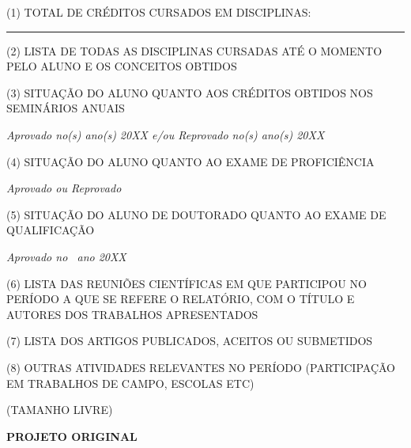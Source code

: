 \documentclass[12pt,a4paper]{article}
\begin{document}
\vspace{1cm}

\noindent (1) TOTAL DE CRÉDITOS CURSADOS EM DISCIPLINAS: \rule{2cm}{0.4pt}

\bigskip

\noindent (2) LISTA DE TODAS AS DISCIPLINAS CURSADAS ATÉ O MOMENTO PELO ALUNO
E OS CONCEITOS OBTIDOS

\bigskip


\bigskip

\noindent (3) SITUAÇÃO DO ALUNO QUANTO AOS CRÉDITOS OBTIDOS NOS SEMINÁRIOS
ANUAIS

\bigskip

{\centering\itshape
Aprovado no(s) ano(s) 20XX e/ou Reprovado no(s) ano(s) 20XX
\par}

\bigskip

\noindent (4) SITUAÇÃO DO ALUNO QUANTO AO EXAME DE PROFICIÊNCIA

\bigskip

{\centering\itshape
Aprovado ou Reprovado
\par}

\bigskip

\noindent (5) SITUAÇÃO DO ALUNO DE DOUTORADO QUANTO AO EXAME DE QUALIFICAÇÃO

\bigskip

{\centering\itshape
Aprovado no \ ano 20XX
\par}

\bigskip

\noindent (6) LISTA DAS REUNIÕES CIENTÍFICAS EM QUE PARTICIPOU NO PERÍODO A QUE
SE REFERE O RELATÓRIO, COM O TÍTULO E AUTORES DOS TRABALHOS APRESENTADOS

\bigskip


\bigskip

\noindent (7) LISTA DOS ARTIGOS PUBLICADOS, ACEITOS OU SUBMETIDOS

\bigskip


\bigskip

\noindent (8) OUTRAS ATIVIDADES RELEVANTES NO PERÍODO (PARTICIPAÇÃO EM
TRABALHOS DE CAMPO, ESCOLAS ETC)

\bigskip


\bigskip

{\centering
(TAMANHO LIVRE)
\par}


\newpage

\begin{center}\textbf{\large PROJETO ORIGINAL}\end{center}
\end{document}
